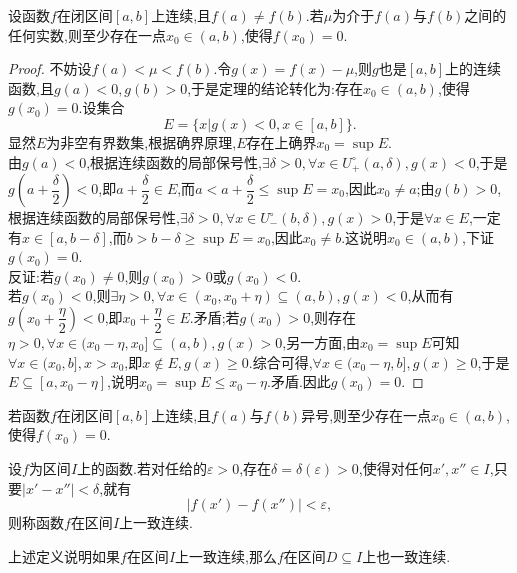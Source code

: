 \begin{theorem}[介值性定理]
    设函数$f$在闭区间$[a,b]$上连续,且$f(a)\neq f(b)$.若$\mu$为介于$f(a)$与$f(b)$之间的任何实数,则至少存在一点$x_0\in(a,b)$,使得$f(x_0)=0$.
\end{theorem}
\begin{proof}
    不妨设$f(a)<\mu<f(b)$.令$g(x)=f(x)-\mu$,则$g$也是$[a,b]$上的连续函数,且$g(a)<0,g(b)>0$,于是定理的结论转化为:存在$x_0\in(a,b)$,使得$g(x_0)=0$.设集合
    \begin{equation*}
        E=\{x|g(x)<0,x\in[a,b]\}.
    \end{equation*}
    显然$E$为非空有界数集,根据确界原理,$E$存在上确界$x_0=\sup E$.\\
    由$g(a)<0$,根据连续函数的局部保号性,$\exists \delta>0,\forall x\in U^{\circ}_{+}(a,\delta),g(x)<0$,于是$\displaystyle g(a+\dfrac{\delta}{2})<0$,即$\displaystyle a+\dfrac{\delta}{2}\in E$,而$\displaystyle a<a+\dfrac{\delta}{2}\leq \sup E=x_0$,因此$x_0\neq a$;由$g(b)>0$,根据连续函数的局部保号性,$\exists \delta>0,\forall x\in U^{\circ}_{-}(b,\delta),g(x)>0$,于是$\forall x\in E$,一定有$x\in[a,b-\delta]$,而$b>b-\delta\geq\sup E=x_0$,因此$x_0\neq b$.这说明$x_0\in(a,b)$,下证$g(x_0)=0$.\\
    反证:若$g(x_0)\neq 0$,则$g(x_0)>0$或$g(x_0)<0$.\\
    若$g(x_0)<0$,则$\exists\eta>0,\forall x\in(x_0,x_0+\eta)\subseteq(a,b),g(x)<0$,从而有$\displaystyle g(x_0+\dfrac{\eta}{2})<0$,即$\displaystyle x_0+\dfrac{\eta}{2}\in E$.矛盾;若$g(x_0)>0$,则存在$\eta>0,\forall x\in(x_0-\eta,x_0]\subseteq(a,b),g(x)>0$,另一方面,由$x_0=\sup E$可知$\forall x\in(x_0,b],x>x_0$,即$x\notin E,g(x)\geq 0$.综合可得,$\forall x\in(x_0-\eta,b],g(x)\geq 0$,于是$E\subseteq[a,x_0-\eta]$,说明$x_0=\sup E\leq x_0-\eta$.矛盾.因此$g(x_0)=0$.
\end{proof}
\begin{theorem}[根的存在定理]
    若函数$f$在闭区间$[a,b]$上连续,且$f(a)$与$f(b)$异号,则至少存在一点$x_0\in(a,b)$,使得$f(x_0)=0$.
\end{theorem}
\begin{definition}
    设$f$为区间$I$上的函数.若对任给的$\varepsilon>0$,存在$\delta=\delta(\varepsilon)>0$,使得对任何$x',x''\in I$,只要$|x'-x''|<\delta$,就有
    \begin{equation*}
        |f(x')-f(x'')|<\varepsilon,
    \end{equation*}
    则称函数$f$在区间$I$上一致连续.
\end{definition}
上述定义说明如果$f$在区间$I$上一致连续,那么$f$在区间$D\subseteq I$上也一致连续.
